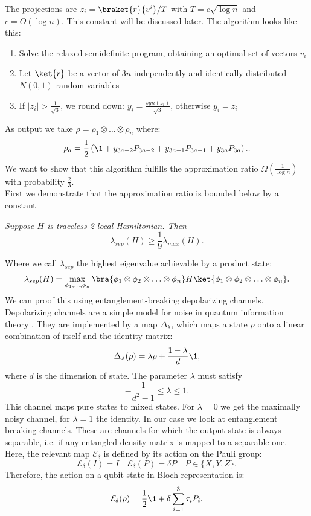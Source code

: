 The projections are $z_i=\braket{r}{v^i}/T$ with $T=c\sqrt{\log{}n}$ and $c=O(\log{}n)$.
This constant will be discussed later.
The algorithm looks like this:
\begin{enumerate}
	\item Solve the relaxed semidefinite program, obtaining an optimal set of vectors $v_i$
	\item Let $\ket{r}$ be a vector of $3n$ independently and identically distributed $N(0,1)$ random variables
	\item If $|z_i|>\frac{1}{\sqrt{3}}$, we round down: $y_i=\frac{sgn(z_i)}{\sqrt{3}}$, otherwise $y_i=z_i$
\end{enumerate}
As output we take $ \rho=\rho_1\otimes\ldots\otimes\rho_n$ where:\[
	\rho_a=\frac{1}{2}\left(\1 +y_{3a-2}P_{3a-2}+y_{3a-1}P_{3a-1}+y_{3a}P_{3a}\right).
.\]
We want to show that this algorithm fulfills the approximation ratio $\Omega(\frac{1}{\log{}n})$ with probability $\frac{2}{3}$.\\
First we demonstrate that the approximation ratio is bounded below by a constant \cite{lieb73}
\begin{thm}\emph{
	Suppose $H$ is traceless 2-local Hamiltonian. Then \[
	\lambda_{sep}(H)\ge \frac{1}{9}\lambda_{max}(H)
.\]}
\end{thm}
Where we call $\lambda_{sep}$ the highest eigenvalue achievable by a product state: \[
	\lambda_{sep}(H)=\max_{\phi_1,\ldots,\phi_n}\bra{\phi_1\otimes\phi_2\otimes\ldots\otimes\phi_n}H\ket{\phi_1\otimes\phi_2\otimes\ldots\otimes\phi_n}
.\]
We can proof this using entanglement-breaking depolarizing channels.
Depolarizing channels are a simple model for noise in quantum information theory \cite{nielsen11}.
They are implemented by a map $\Delta_{\lambda}$, which maps a state  $\rho$ onto a linear combination of itself and the identity matrix:\cite{king02}\[
	\Delta_{\lambda}(\rho)=\lambda\rho+\frac{1-\lambda}{d}\1,
\]
where $d$ is the dimension of state. The parameter $\lambda$ must satisfy \[
	-\frac{1}{d^2-1}\le\lambda\le 1
.\]
This channel maps pure states to mixed states.
For $\lambda=0$ we get the maximally noisy channel, for $\lambda=1$ the identity.
In our case we look at entanglement breaking channels.
These are channels for which the output state is always separable, i.e. if any entangled density matrix is mapped to a separable one.\cite{horodecki03}
Here, the relevant map $\mathcal{E}_{\delta}$ is defined by its action on the Pauli group: \[
	\mathcal{E}_{\delta}(I)=I\quad\mathcal{E}_{\delta}(P)=\delta P\quad P\in \{X,Y,Z\}
.\]
Therefore, the action on a qubit state in Bloch representation is: \[
	\mathcal{E}_{\delta}(\rho) =  \frac{1}{2}\1 + \delta \sum_{i=1}^{3} \tau_i P_i
.\]
